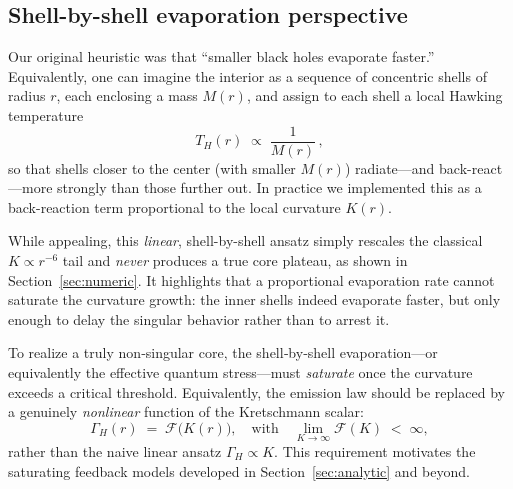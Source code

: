 \subsection{Shell-by-shell evaporation perspective}
\label{sec:shell_evap}

Our original heuristic was that “smaller black holes evaporate faster.”  Equivalently, one can imagine the interior as a sequence of concentric shells of radius \(r\), each enclosing a mass \(M(r)\), and assign to each shell a local Hawking temperature
\[
  T_H(r)\;\propto\;\frac{1}{M(r)}\,,
\]
so that shells closer to the center (with smaller \(M(r)\)) radiate—and back-react—more strongly than those further out.  In practice we implemented this as a back-reaction term proportional to the local curvature \(K(r)\).  

While appealing, this \emph{linear}, shell-by-shell ansatz simply rescales the classical \(K\propto r^{-6}\) tail and \emph{never} produces a true core plateau, as shown in Section~\ref{sec:numeric}.  It highlights that a proportional evaporation rate cannot saturate the curvature growth: the inner shells indeed evaporate faster, but only enough to delay the singular behavior rather than to arrest it.  

To realize a truly non‑singular core, the shell‑by‑shell evaporation—or equivalently the effective quantum stress—must \emph{saturate} once the curvature exceeds a critical threshold.  Equivalently, the emission law should be replaced by a genuinely \emph{nonlinear} function of the Kretschmann scalar:
\[
  \Gamma_H(r)\;=\;\mathcal{F}\bigl(K(r)\bigr),
  \quad
  \text{with}
  \quad
  \lim_{K\to\infty}\mathcal{F}(K)\;<\;\infty,
\]
rather than the naive linear ansatz
\(\Gamma_H\propto K\).  This requirement motivates the saturating feedback models developed in Section~\ref{sec:analytic} and beyond.  

